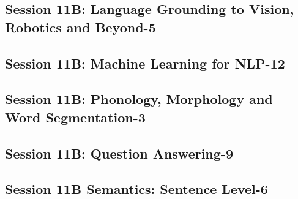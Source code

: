 \subsection{\large Session 11B: Language Grounding to Vision, Robotics and Beyond-5}
\label{parallel-session-11B-trackD}
\TrackDLoc\hfill\sessionchair{}{}
\clearpage
\subsection{\large Session 11B: Machine Learning for NLP-12}
\label{parallel-session-11B-trackE}
\TrackELoc\hfill\sessionchair{}{}
\clearpage
\subsection{\large Session 11B: Phonology, Morphology and Word Segmentation-3}
\label{parallel-session-11B-trackF}
\TrackFLoc\hfill\sessionchair{}{}
\clearpage
\subsection{\large Session 11B: Question Answering-9}
\label{parallel-session-11B-trackG}
\TrackGLoc\hfill\sessionchair{}{}
\clearpage
\subsection{\large Session 11B Semantics: Sentence Level-6}
\label{parallel-session-11B-trackH}
\TrackHLoc\hfill\sessionchair{}{}
\clearpage


